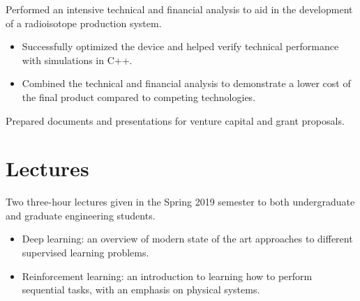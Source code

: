 \documentclass[]{deedy-resume-openfont}
\begin{document}
\begin{minipage}[t]{0.66\textwidth}
\begin{tightemize}
\item Performed an intensive technical and financial analysis to aid in the development of a radioisotope production system.
  \begin{itemize}
  \item Successfully optimized the device and helped verify technical performance with simulations in C++.
  \item Combined the technical and financial analysis to demonstrate a lower cost of the final product compared to competing technologies.
  \end{itemize}
\item Prepared documents and presentations for venture capital and grant proposals.
\end{tightemize}
\sectionsep


\section{Lectures}
\begin{tightemize}
\item Two three-hour lectures given in the Spring 2019 semester to both undergraduate and graduate engineering students.
	\begin{itemize}
	\item Deep learning: an overview of modern state of the art approaches to different supervised learning problems.
	\item Reinforcement learning: an introduction to learning how to perform sequential tasks, with an emphasis on physical systems.
	\end{itemize}
\end{tightemize}


\end{minipage}
\end{document}
